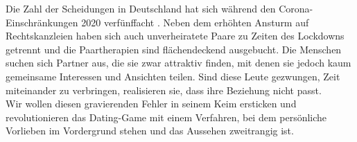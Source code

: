 
Die Zahl der Scheidungen in Deutschland hat sich während den Corona-Einschränkungen 2020 verfünffacht \cite{scheidungen}. Neben dem erhöhten Ansturm auf Rechtskanzleien haben sich auch unverheiratete Paare zu Zeiten des Lockdowns getrennt und die Paartherapien sind flächendeckend ausgebucht. Die Menschen suchen sich Partner aus, die sie zwar attraktiv finden, mit denen sie jedoch kaum gemeinsame Interessen und Ansichten teilen. Sind diese Leute gezwungen, Zeit miteinander zu verbringen, realisieren sie, dass ihre Beziehung nicht passt.\\
Wir wollen diesen gravierenden Fehler in seinem Keim ersticken und revolutionieren das Dating-Game mit einem Verfahren, bei dem persönliche Vorlieben im Vordergrund stehen und das Aussehen zweitrangig ist.


